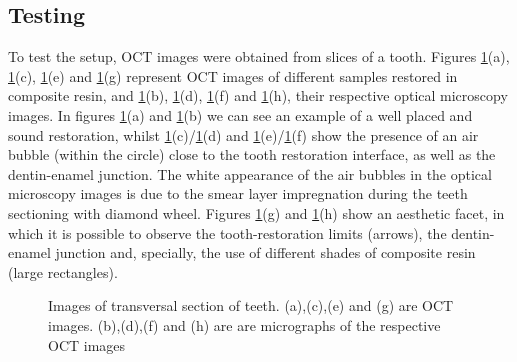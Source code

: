\documentclass[12pt,twoside,english]{book}
\renewcommand{\~}{\perispomeni}%
\numberwithin{equation}{section}
\numberwithin{figure}{section}
\begin{document}
\subsection{Testing}

To test the setup, OCT images were obtained from slices of a tooth. Figures \ref{fig:SROCT2 test}(a), \ref{fig:SROCT2 test}(c), \ref{fig:SROCT2 test}(e) and \ref{fig:SROCT2 test}(g) represent OCT images of different samples restored in composite resin, and \ref{fig:SROCT2 test}(b), \ref{fig:SROCT2 test}(d), \ref{fig:SROCT2 test}(f) and \ref{fig:SROCT2 test}(h), their respective optical microscopy images. In figures \ref{fig:SROCT2 test}(a) and \ref{fig:SROCT2 test}(b) we can see an example of a well placed and sound restoration, whilst \ref{fig:SROCT2 test}(c)/\ref{fig:SROCT2 test}(d) and \ref{fig:SROCT2 test}(e)/\ref{fig:SROCT2 test}(f) show the presence of an air bubble (within the circle) close to the tooth restoration interface, as well as the dentin-enamel junction. The white appearance of the air bubbles in the optical microscopy images is due to the smear layer impregnation during the teeth sectioning with diamond wheel. Figures \ref{fig:SROCT2 test}(g) and \ref{fig:SROCT2 test}(h) show an aesthetic facet, in which it is possible to observe the tooth-restoration limits (arrows), the dentin-enamel junction and, specially, the use of different shades of composite resin (large rectangles).

%
\begin{figure}[]
\noindent \begin{centering}

\caption{Images of transversal section of teeth. (a),(c),(e) and (g) are OCT images. (b),(d),(f) and (h) are are micrographs of the respective OCT images}
\label{fig:SROCT2 test}
\par\end{centering}
\end{figure}
\end{document}
